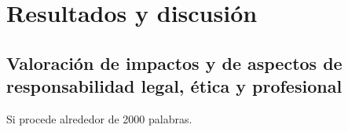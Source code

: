 \chapter{Resultados y discusión}
\Blindtext

\section{Valoración de impactos y de aspectos de responsabilidad legal, ética y profesional}
Si procede alrededor de 2000 palabras.